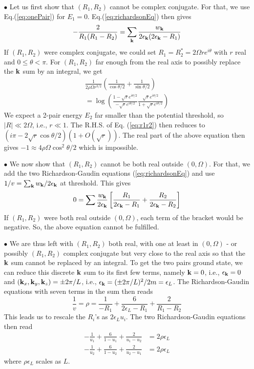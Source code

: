 \documentclass[5p,twocolumn]{elsarticle}
\begin{document}
$\bullet$ Let us first show that $(R_1,R_2)$ cannot be complex conjugate. For that, we use Eq.(\ref{eq:onePair}) for $E_1=0$. Eq.(\ref{eq:richardsonEq}) then gives
\begin{equation}
-\frac{2}{R_{1}(R_{1}-R_{2})}=\sum_{\mathbf{k}}\frac{w_{\mathbf{k}}}{2\epsilon_{\mathbf{k}}(2\epsilon_{\mathbf{k}}-R_{1})}
\end{equation}
If $(R_1,R_2)$ were complex conjugate, we could set $R_1=R^*_2=2 \Omega r e^{i\theta}$ with $r$ real and $0\leqslant\theta<\pi$. For $(R_1,R_2)$ far enough from the real axis to possibly replace the $\mathbf{k}$ sum by an integral, we get
\begin{multline}\label{eq:r1r2}
\frac{1}{2\rho\Omega{r^{3/2}}}\left(\frac{1}{\cos\theta/2}+\frac{1}{\sin\theta/2}\right)\\
=\log\left(\frac{1-\sqrt{r}e^{i\theta/2}}{-\sqrt{r}e^{i\theta/2}}\frac{\sqrt{r}e^{i\theta/2}}{1+\sqrt{r}e^{i\theta/2}}\right)
\end{multline}
We expect a 2-pair energy $E_{2}$ far smaller than the potential threshold, so $|R|\ll2 \Omega$, i.e., $r\ll1$. The R.H.S. of Eq. (\ref{eq:r1r2}) then reduces to 
$(i\pi-2\sqrt r\cos\theta/2)(1+O(\sqrt r))$. The real part of the above equation then gives $-1\approx4 \rho \Omega\cos^2\theta/2$ which is impossible.


$\bullet$ We now show that $(R_1,R_2)$ cannot be both real outside $(0,\Omega)$. For that, we add the two Richardson-Gaudin equations (\ref{eq:richardsonEq}) and use $1/v=\sum_{\mathbf{k}}w_{\mathbf{k}}/2\epsilon_{\mathbf{k}}$ at threshold. This gives
\begin{equation}
0=\sum\frac{w_{\mathbf{k}}}{2\epsilon_{\mathbf{k}}}\left[\frac{R_{1}}{2\epsilon_{\mathbf{k}}-R_{1}}+\frac{R_{2}}{2\epsilon_{\mathbf{k}}-R_{2}}\right]
\end{equation}
If $(R_1,R_2)$ were both real outside $(0,\Omega)$, each term of the bracket would be negative. So, the above equation cannot be fulfilled.


$\bullet$ We are thus left with $(R_1,R_2)$ both real, with one at least in $(0,\Omega)$ - or possibly $(R_1,R_2)$ complex conjugate but very close to the real axis so that the $\mathbf{k}$ sum cannot be replaced by an integral. To get the two pairs ground state, we can reduce this discrete $\mathbf{k}$ sum to its first few terms, namely $\mathbf{k}=0$, i.e., $\epsilon_{\mathbf{k}}=0$ and
 $(\mathbf{k}_x,\mathbf{k}_y,\mathbf{k}_z)=\pm 2\pi/L
 $, i.e., $\epsilon_{\mathbf{k}}=(\pm 2\pi/L)^2/2m=\epsilon_L$. The Richardson-Gaudin equations with seven terms in the sum then reads
\begin{equation}
\frac{1}{v}=\rho=\frac{1}{-R_{1}}+\frac{6}{2\epsilon_{L}-R_{1}}+\frac{2}{R_{1}-R_{2}}
\end{equation}
This leads us to rescale the $R_i$'s as $2\epsilon_L u_i$. The two Richardson-Gaudin equations then read
\begin{equation}
\begin{split}
-\frac{1}{u_{1}}+\frac{6}{1-u_{1}}+\frac{2}{u_{1}-u_{2}}&=2\rho\epsilon_{L}\\
-\frac{1}{u_{2}}+\frac{6}{1-u_{2}}+\frac{2}{u_{2}-u_{1}}&=2\rho\epsilon_{L}
\end{split}\label{eq:t12}
\end{equation}
where $\rho\epsilon_L$ scales as $L$.
\end{document}
